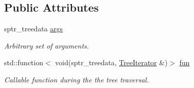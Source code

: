 \subsection*{Public Attributes}
\begin{DoxyCompactItemize}
\item 
sptr\+\_\+treedata \hyperlink{classTree_ac2ff3911dfe768b18be9f6cc2baca89e}{args}\hypertarget{classTree_ac2ff3911dfe768b18be9f6cc2baca89e}{}\label{classTree_ac2ff3911dfe768b18be9f6cc2baca89e}

\begin{DoxyCompactList}\small\item\em Arbitrary set of arguments. \end{DoxyCompactList}\item 
std\+::function$<$ void(sptr\+\_\+treedata, \hyperlink{classTreeIterator}{Tree\+Iterator} \&)$>$ \hyperlink{classTree_ad98f51efc931f96c687c65d4387d19e9}{fun}
\begin{DoxyCompactList}\small\item\em Callable function during the the tree traversal. \end{DoxyCompactList}\end{DoxyCompactItemize}

